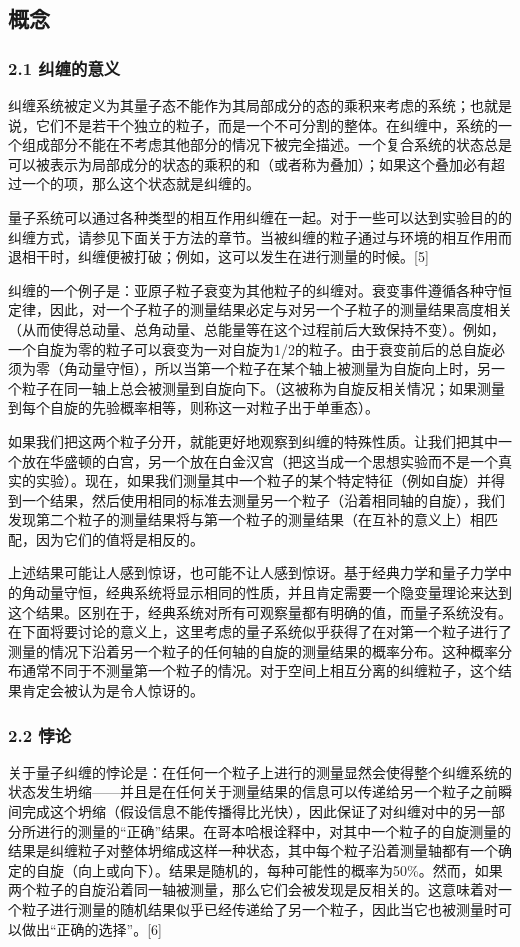 \subsection{概念}
\subsubsection{2.1 纠缠的意义}
纠缠系统被定义为其量子态不能作为其局部成分的态的乘积来考虑的系统；也就是说，它们不是若干个独立的粒子，而是一个不可分割的整体。在纠缠中，系统的一个组成部分不能在不考虑其他部分的情况下被完全描述。一个复合系统的状态总是可以被表示为局部成分的状态的乘积的和（或者称为叠加）；如果这个叠加必有超过一个的项，那么这个状态就是纠缠的。

       量子系统可以通过各种类型的相互作用纠缠在一起。对于一些可以达到实验目的的纠缠方式，请参见下面关于方法的章节。当被纠缠的粒子通过与环境的相互作用而退相干时，纠缠便被打破；例如，这可以发生在进行测量的时候。[5]

       纠缠的一个例子是：亚原子粒子衰变为其他粒子的纠缠对。衰变事件遵循各种守恒定律，因此，对一个子粒子的测量结果必定与对另一个子粒子的测量结果高度相关（从而使得总动量、总角动量、总能量等在这个过程前后大致保持不变）。例如，一个自旋为零的粒子可以衰变为一对自旋为1/2的粒子。由于衰变前后的总自旋必须为零（角动量守恒），所以当第一个粒子在某个轴上被测量为自旋向上时，另一个粒子在同一轴上总会被测量到自旋向下。（这被称为自旋反相关情况；如果测量到每个自旋的先验概率相等，则称这一对粒子出于单重态）。

如果我们把这两个粒子分开，就能更好地观察到纠缠的特殊性质。让我们把其中一个放在华盛顿的白宫，另一个放在白金汉宫（把这当成一个思想实验而不是一个真实的实验）。现在，如果我们测量其中一个粒子的某个特定特征（例如自旋）并得到一个结果，然后使用相同的标准去测量另一个粒子（沿着相同轴的自旋），我们发现第二个粒子的测量结果将与第一个粒子的测量结果（在互补的意义上）相匹配，因为它们的值将是相反的。

       上述结果可能让人感到惊讶，也可能不让人感到惊讶。基于经典力学和量子力学中的角动量守恒，经典系统将显示相同的性质，并且肯定需要一个隐变量理论来达到这个结果。区别在于，经典系统对所有可观察量都有明确的值，而量子系统没有。在下面将要讨论的意义上，这里考虑的量子系统似乎获得了在对第一个粒子进行了测量的情况下沿着另一个粒子的任何轴的自旋的测量结果的概率分布。这种概率分布通常不同于不测量第一个粒子的情况。对于空间上相互分离的纠缠粒子，这个结果肯定会被认为是令人惊讶的。

\subsubsection{2.2 悖论}
关于量子纠缠的悖论是：在任何一个粒子上进行的测量显然会使得整个纠缠系统的状态发生坍缩——并且是在任何关于测量结果的信息可以传递给另一个粒子之前瞬间完成这个坍缩（假设信息不能传播得比光快），因此保证了对纠缠对中的另一部分所进行的测量的“正确”结果。在哥本哈根诠释中，对其中一个粒子的自旋测量的结果是纠缠粒子对整体坍缩成这样一种状态，其中每个粒子沿着测量轴都有一个确定的自旋（向上或向下）。结果是随机的，每种可能性的概率为50\%。然而，如果两个粒子的自旋沿着同一轴被测量，那么它们会被发现是反相关的。这意味着对一个粒子进行测量的随机结果似乎已经传递给了另一个粒子，因此当它也被测量时可以做出“正确的选择”。[6]

